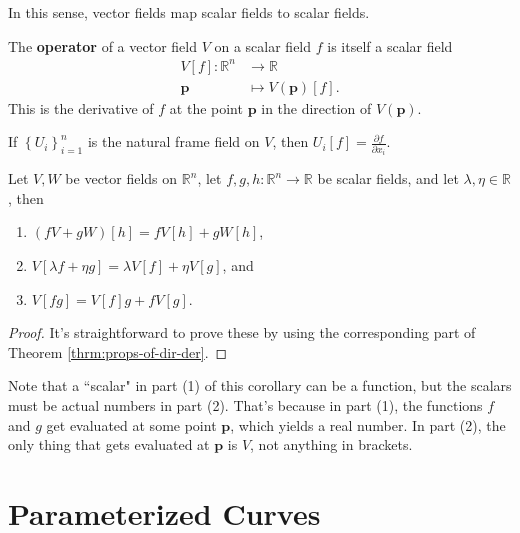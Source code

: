 \documentclass[10pt]{report}
\begin{document}
\begin{note}
In this sense, vector fields map scalar fields to scalar fields.
\end{note}

\begin{defn}
	The \textbf{operator} of a vector field $V$ on a scalar field $f$ is itself a scalar field
	\begin{align*}
		V[f]: \mathbb{R}^n &\to \mathbb{R} \\
		\mathbf{p} &\mapsto V(\mathbf{p})[f].
	\end{align*}
	This is the derivative of $f$ at the point $\mathbf{p}$ in the direction of $V(\mathbf{p})$.
\end{defn}

\begin{ex}
If $\left\{ U_i \right\}_{i=1}^n$ is the natural frame field on $V$, then $U_i[f] = \frac{\partial f}{\partial x_i} .$
\end{ex}

\begin{cor}
	Let $V,W$ be vector fields on $\mathbb{R}^n$, let $f,g,h:\mathbb{R}^n \to \mathbb{R}$ be scalar fields, and let $\lambda,\eta \in \mathbb{R}$, then
	\begin{enumerate}
		\item $(fV+gW)[h] = fV[h] + gW[h]$,
		\item $V[\lambda f+\eta g] = \lambda V[f] + \eta V[g]$, and
		\item $V[fg] = V[f] g + f V[g]$.
	\end{enumerate}
\end{cor}
\begin{proof}
	It's straightforward to prove these by using the corresponding part of Theorem \ref{thrm:props-of-dir-der}.
\end{proof}

Note that a ``scalar" in part (1) of this corollary can be a function, but the scalars must be actual numbers in part (2). That's because in part (1), the functions $f$ and $g$ get evaluated at some point $\mathbf{p}$, which yields a real number. In part (2), the only thing that gets evaluated at $\mathbf{p}$ is $V$, not anything in brackets.


\section{Parameterized Curves}
\end{document}
